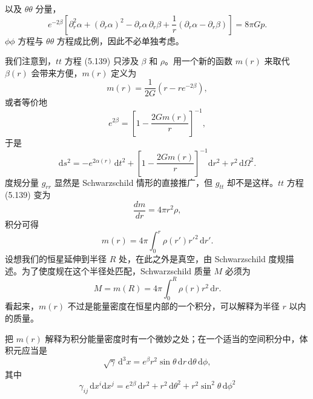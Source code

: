 以及 $\theta\theta$ 分量，
\begin{equation*}
e^{-2\beta}\left[\partial_r^2\alpha + (\partial_r\alpha)^2 - \partial_r\alpha\,\partial_r\beta + \frac{1}{r}(\partial_r\alpha - \partial_r\beta)\right] = 8\pi Gp.
\tag{5.141}
\end{equation*}
$\phi\phi$ 方程与 $\theta\theta$ 方程成比例，因此不必单独考虑。

我们注意到，$tt$ 方程 (5.139) 只涉及 $\beta$ 和 $\rho$。用一个新的函数 $m(r)$ 来取代 $\beta(r)$ 会带来方便，$m(r)$ 定义为
\begin{equation*}
m(r) = \frac{1}{2G}\left(r - re^{-2\beta}\right),
\tag{5.142}
\end{equation*}
或者等价地
\begin{equation*}
e^{2\beta} = \left[1 - \frac{2Gm(r)}{r}\right]^{-1},
\tag{5.143}
\end{equation*}
于是
\begin{equation*}
\mathrm{d}s^2 = -e^{2\alpha(r)}\,\mathrm{d}t^2 + \left[1 - \frac{2Gm(r)}{r}\right]^{-1}\mathrm{d}r^2 + r^2\,\mathrm{d}\Omega^2.
\tag{5.144}
\end{equation*}
度规分量 $g_{rr}$ 显然是 Schwarzschild 情形的直接推广，但 $g_{tt}$ 却不是这样。$tt$ 方程 (5.139) 变为
\begin{equation*}
\frac{dm}{dr} = 4\pi r^2\rho,
\tag{5.145}
\end{equation*}
积分可得
\begin{equation*}
m(r) = 4\pi\int_0^r \rho(r')r'^2\,\mathrm{d}r'.
\tag{5.146}
\end{equation*}
设想我们的恒星延伸到半径 $R$ 处，在此之外是真空，由 Schwarzschild 度规描述。为了使度规在这个半径处匹配，Schwarzschild 质量 $M$ 必须为
\begin{equation*}
M = m(R) = 4\pi\int_0^R \rho(r)r^2\,\mathrm{d}r.
\tag{5.147}
\end{equation*}
看起来，$m(r)$ 不过是能量密度在恒星内部的一个积分，可以解释为半径 $r$ 以内的质量。

把 $m(r)$ 解释为积分能量密度时有一个微妙之处；在一个适当的空间积分中，体积元应当是
\begin{equation*}
\sqrt{\gamma}\,\mathrm{d}^3x = e^{\beta}r^2\sin\theta\,\mathrm{d}r\,\mathrm{d}\theta\,\mathrm{d}\phi,
\tag{5.148}
\end{equation*}
其中
\begin{equation*}
\gamma_{ij}\,\mathrm{d}x^i\mathrm{d}x^j = e^{2\beta}\,\mathrm{d}r^2 + r^2\,\mathrm{d}\theta^2 + r^2\sin^2\theta\,\mathrm{d}\phi^2
\tag{5.149}
\end{equation*}

